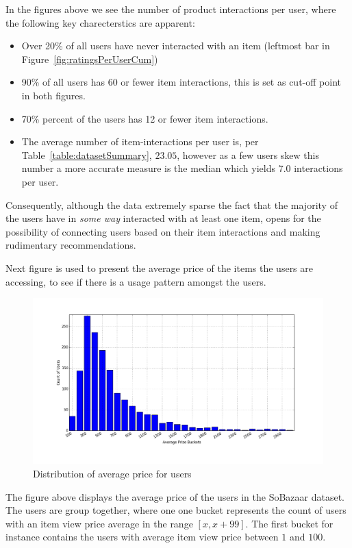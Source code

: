 In the figures above we see the number of product interactions per user, where
the following key charecterstics are apparent:

\begin{itemize}
  \item Over 20\% of all users have never interacted with an item (leftmost bar
  in Figure~\ref{fig:ratingsPerUserCum})
  \item 90\% of all users has 60 or fewer item interactions, this is set as
  cut-off point in both figures.
  \item 70\% percent of the users has 12 or fewer item interactions.
  \item The average number of item-interactions per user is, per
  Table~\ref{table:datasetSummary},
  $23.05$, however as a few users skew this number a more accurate measure is
  the median which yields $7.0$ interactions per user.
\end{itemize}

Consequently, although the data extremely sparse the fact that the majority of
the users have in \textit{some way} interacted with at least one item, opens
for the possibility of connecting users based on their item interactions and
making rudimentary recommendations.

Next figure is used to present the average price of the items the users are
accessing, to see if there is a usage pattern amongst the users.

\begin{figure}[H]
  \includegraphics[width=5in]{image/avgUserPricesdistribution.png}
  \centering
  \caption{Distribution of average price for users}
  \label{fig:priceperUserDist}
\end{figure}

The figure above displays the average price of the users in the SoBazaar dataset.
The users are group together, where one one bucket represents the count of users
with an item view price average in the range $[x,x+99]$. The first bucket for
instance contains the users with average item view price between $1$ and $100$.

